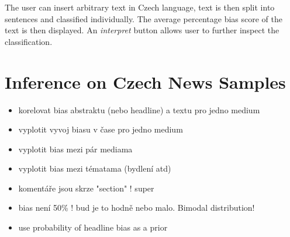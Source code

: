 The user can insert arbitrary text in Czech language, text is then split into sentences and classified individually. The average percentage bias score of the text is then displayed. An \textit{interpret} button allows user to further inspect the classification.


  

\section{Inference on Czech News Samples}\label{inference}

\begin{itemize}
    \item korelovat bias abstraktu (nebo headline) a textu pro jedno medium
    \item vyplotit vyvoj biasu v čase pro jedno medium
    \item vyplotit bias mezi pár mediama
    \item vyplotit bias mezi tématama (bydlení atd)
    \item komentáře jsou skrze "section" ! super
    \item bias není 50\% ! bud je to hodně nebo malo. Bimodal distribution!
    \item use probability of headline bias as a prior
\end{itemize}
